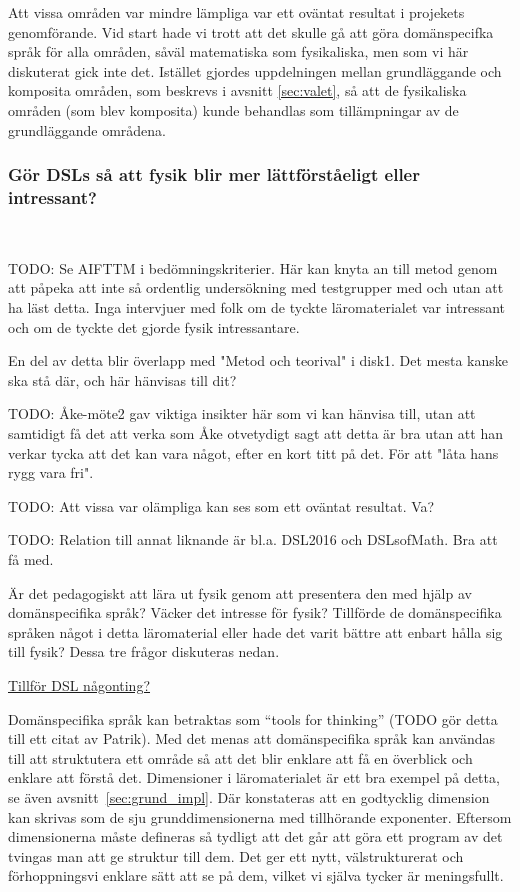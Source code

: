 \begin{draft}
Att vissa områden var mindre lämpliga var ett oväntat resultat i projekets genomförande. Vid start hade vi trott att det skulle gå att göra domänspecifka språk för alla områden, såväl matematiska som fysikaliska, men som vi här diskuterat gick inte det. Istället gjordes uppdelningen mellan grundläggande och komposita områden, som beskrevs i avsnitt \ref{sec:valet}, så att de fysikaliska områden (som blev komposita) kunde behandlas som tillämpningar av de grundläggande områdena.

\subsubsection{Gör DSLs så att fysik blir mer lättförståeligt eller
intressant?}~\label{sec:bara_fysik}

TODO: Se AIFTTM i bedömningskriterier. Här kan knyta an till metod genom att
påpeka att inte så ordentlig undersökning med testgrupper med och utan att ha
läst detta. Inga intervjuer med folk om de tyckte läromaterialet var intressant
och om de tyckte det gjorde fysik intressantare.

En del av detta blir överlapp med "Metod och teorival" i disk1. Det mesta kanske
ska stå där, och här hänvisas till dit?

TODO: Åke-möte2 gav viktiga insikter här som vi kan hänvisa till, utan att
samtidigt få det att verka som Åke otvetydigt sagt att detta är bra utan att han
verkar tycka att det kan vara något, efter en kort titt på det. För att "låta
hans rygg vara fri".

TODO: Att vissa var olämpliga kan ses som ett oväntat resultat. Va?

TODO: Relation till annat liknande är bl.a. DSL2016 och DSLsofMath. Bra att få
med.

Är det pedagogiskt att lära ut fysik genom att presentera den med hjälp av
domänspecifika språk? Väcker det intresse för fysik? Tillförde de domänspecifika
språken något i detta läromaterial eller hade det varit bättre att enbart hålla
sig till fysik? Dessa tre frågor diskuteras nedan.

{\Large \underline{Tillför DSL någonting?}}

Domänspecifika språk kan betraktas som ``tools for thinking'' (TODO gör detta
till ett citat av Patrik). Med det menas att domänspecifika språk kan användas
till att struktutera ett område så att det blir enklare att få en överblick och
enklare att förstå det. Dimensioner i läromaterialet är ett bra exempel på
detta, se även avsnitt~\ref{sec:grund_impl}. Där konstateras att en godtycklig
dimension kan skrivas som de sju grunddimensionerna med tillhörande exponenter.
Eftersom dimensionerna måste defineras så tydligt att det går att göra ett
program av det tvingas man att ge struktur till dem. Det ger ett nytt,
välstrukturerat och förhoppningsvi enklare sätt att se på dem, vilket vi själva
tycker är meningsfullt.


\end{draft}
